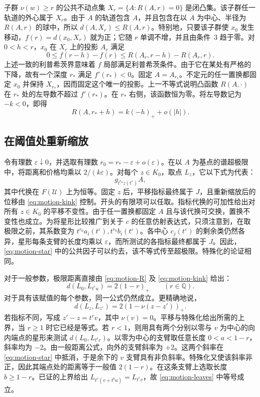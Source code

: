 子群 \(\nu(w)\ge r\) 的公共不动点集 \(X_r=\{A:R(A,r)=0\}\) 是闭凸集。该子群任一轨道的外心属于 \(X_r\)。由于 \(A\) 的轨道包含 \(A\)，并且包含在以 \(A\) 为中心、半径为 \(R(A,r)\) 的球中，所以 \(d(A,X_r)\le R(A,r)\)。特别地，只要该子群使 \(x_0\) 发生移动，\(f(r)=d(x_0,X_r)\) 就为正；它随 \(r\) 单调不增，并且由条件~3 趋于零。对 \(0<h<r\)，\(x_0\) 在 \(X_r\) 上的投影 \(A_r\) 满足
\[
 0\le f(r-h)-f(r)\le R(A_r,r-h)-R(A_r,r).
\]
上述一致的利普希茨界意味着 \(f\) 局部满足利普希茨条件。由于它在某处有严格的下降，故有一个深度 \(r_*\) 满足 \(f'(r_*)<0\)。固定 \(A=A_{r_*}\)。不定元的任一置换都固定 \(x_0\) 并保持 \(X_{r_*}\)，因而固定这个唯一的投影。上一不等式说明凸函数 \(R(A,\cdot)\) 在 \(r_*\) 处的左导数不超过 \(f'(r_*)\)。在 \(r_*\) 右侧，该函数恒为零。将左导数记为 \(-k<0\)，即得
\begin{equation}\label{eq:motion-kink}
 R(A,r_*+h)=k(-h)_+ +o(|h|).
\end{equation}

\subsection{在阈值处重新缩放}

令有理数 \(\varepsilon\downarrow0\)，并选取有理数 \(r_0=r_*-\varepsilon+o(\varepsilon)\)。在以 \(A\) 为基点的谱超极限中，将距离和价格均乘以 \(2/(k\varepsilon)\)。对每个 \(z\in K_0\)，取点 \(L_z\)，它以下式为代表：
\[
   g_{t^{r_0}z(t^\varepsilon)}A ,
\]
其中代换在 \(F(\mathcal U)\) 上为恒等。固定 \(z\) 后，平移指标最终属于 \(J\)，且重新缩放后的位移由 \eqref{eq:motion-kink} 控制。开头的有限项可以任取。指标代换的可加性给出对所有 \(z\in K_0\) 的平移不变性。由于任一置换都固定 \(A\) 且与该代换可交换，置换不变性也成立。为将星形比较推广到关于 \(c\) 的任意仿射表达式，只须注意到，在取极限之前，其系数变为 \(t^{r_0}a_i(t^\varepsilon),t^{r_0}b_i(t^\varepsilon)\)。各中心 \(c_j(t^\varepsilon)\) 的剩余类仍然各异，星形每条支臂的长度均乘以 \(\varepsilon\)，而所测试的各指标最终都属于 \(J\)。因此，\eqref{eq:motion-star} 中的公共因子可以约去，该不等式传至超极限。特殊化的论证相同。

对于一般参数，极限距离直接由 \eqref{eq:motion-R} 及 \eqref{eq:motion-kink} 给出：
\[
 d(L_0,L_{t^ru})=2(1-r)_+
 \qquad(r\in\mathbb Q).
\]
对于具有该赋值的每个参数，同一公式仍然成立。更精确地说，
\begin{equation}\label{eq:motion-leaves}
 d(L_z,L_{z'})=2(1-\nu(z-z'))_+ .
\end{equation}
若指标不同，写成 \(z'-z=t^r v\)，其中 \(\nu(v)=0\)。平移与特殊化给出所需的上界，当 \(r\ge1\) 时它已经是等式。若 \(r<1\)，则用具有两个分别以零与 \(v\) 为中心的向内端点的星形来测试 \(d(L_0,L_{t^rc})\)。以零为中心的支臂取任意长度 \(0<a<1-r\)，斜率均为 \(-2\)。由一般距离公式，向外的支臂斜率为 \(+2\)。这两个斜率在 \eqref{eq:motion-star} 中抵消，于是余下的 \(v\) 支臂具有非负斜率。特殊化又使该斜率非正，因此其端点处的距离等于一般值 \(2(1-r)\)。在这条支臂上选取长度 \(b\ge1-r\)。已证的上界给出 \(L_{t^r(v+t^bu)}=L_{t^rv}\)，故 \eqref{eq:motion-leaves} 中等号成立。

